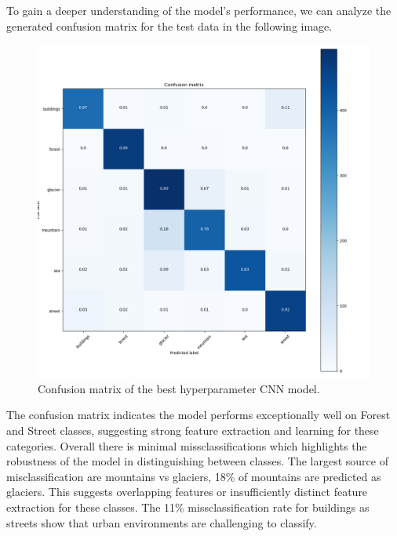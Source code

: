 To gain a deeper understanding of the model's performance, we can analyze the generated confusion matrix for the test data in the following image.
\begin{figure}[H]
    \centering
    \includegraphics[width=1\linewidth]{images/cnn_tensorboard_cm.png}
    \caption{Confusion matrix of the best hyperparameter CNN model.}
    \label{fig:CNN_cm}
\end{figure}

The confusion matrix indicates the model performs exceptionally well on Forest and Street classes, suggesting strong feature extraction and learning for these categories. Overall there is minimal missclassifications which highlights the robustness of the model in distinguishing between classes.
The largest source of misclassification are mountains vs glaciers, 18\% of mountains are predicted as glaciers. This suggests overlapping features or insufficiently distinct feature extraction for these classes. The 11\% missclassification rate for buildings as streets show that urban environments are challenging to classify.